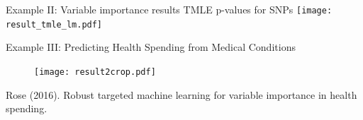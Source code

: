 \documentclass[t]{beamer}
\begin{document}

\begin{frame}{Example II: Variable importance results}
TMLE p-values for SNPs
\texttt{[image: result\_tmle\_lm.pdf]}


\end{frame}

\begin{frame}{Example III: Predicting Health Spending from Medical Conditions}
\begin{figure}
\vspace{-2pt}
\texttt{[image: result2crop.pdf]}
\end{figure}
\tiny{Rose (2016). Robust targeted machine learning for variable importance in health spending.}
\end{frame}

\end{document}
